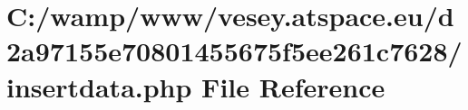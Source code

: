 \hypertarget{d2a97155e70801455675f5ee261c7628_2insertdata_8php}{\section{C\-:/wamp/www/vesey.atspace.\-eu/d2a97155e70801455675f5ee261c7628/insertdata.php File Reference}
\label{d2a97155e70801455675f5ee261c7628_2insertdata_8php}
}
